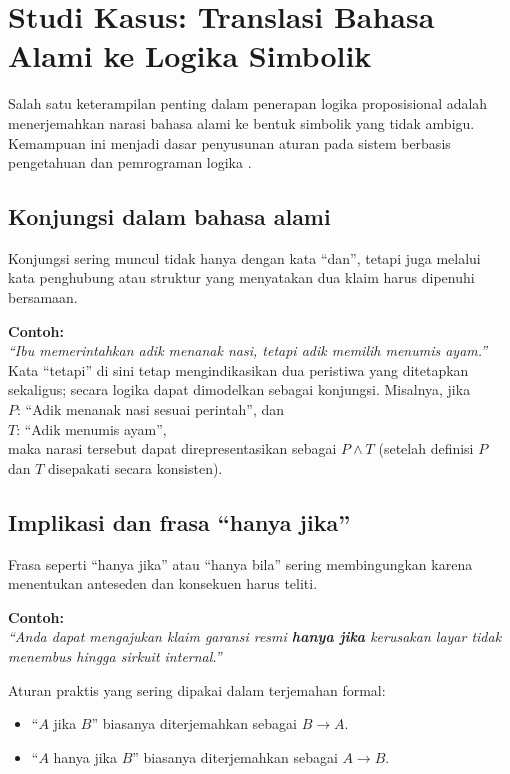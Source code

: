 \section{Studi Kasus: Translasi Bahasa Alami ke Logika Simbolik}

Salah satu keterampilan penting dalam penerapan logika proposisional adalah menerjemahkan narasi bahasa alami ke bentuk simbolik yang tidak ambigu. Kemampuan ini menjadi dasar penyusunan aturan pada sistem berbasis pengetahuan dan pemrograman logika \cite{rosen2019}.

\subsection{Konjungsi dalam bahasa alami}

Konjungsi sering muncul tidak hanya dengan kata ``dan'', tetapi juga melalui kata penghubung atau struktur yang menyatakan dua klaim harus dipenuhi bersamaan.

\textbf{Contoh:} \\
\textit{``Ibu memerintahkan adik menanak nasi, tetapi adik memilih menumis ayam.''} \\
Kata ``tetapi'' di sini tetap mengindikasikan dua peristiwa yang ditetapkan sekaligus; secara logika dapat dimodelkan sebagai konjungsi. Misalnya, jika \\
$P$: ``Adik menanak nasi sesuai perintah'', dan \\
$T$: ``Adik menumis ayam'', \\
maka narasi tersebut dapat direpresentasikan sebagai $P \wedge T$ (setelah definisi $P$ dan $T$ disepakati secara konsisten).

\subsection{Implikasi dan frasa ``hanya jika''}

Frasa seperti ``hanya jika'' atau ``hanya bila'' sering membingungkan karena menentukan anteseden dan konsekuen harus teliti.

\textbf{Contoh:} \\
\textit{``Anda dapat mengajukan klaim garansi resmi \textbf{hanya jika} kerusakan layar tidak menembus hingga sirkuit internal.''}

Aturan praktis yang sering dipakai dalam terjemahan formal:
\begin{itemize}
    \item ``$A$ jika $B$'' biasanya diterjemahkan sebagai $B \rightarrow A$.
    \item ``$A$ hanya jika $B$'' biasanya diterjemahkan sebagai $A \rightarrow B$.
\end{itemize}

